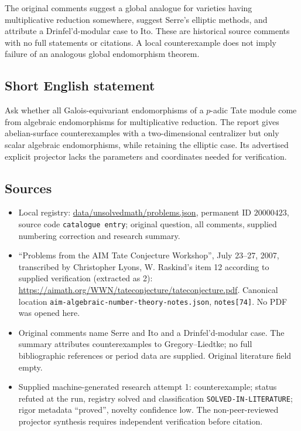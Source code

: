 \documentclass[11pt]{article}
\begin{document}
The original comments suggest a global analogue for varieties having multiplicative reduction somewhere, suggest Serre's elliptic methods, and attribute a Drinfel'd-modular case to Ito. These are historical source comments with no full statements or citations. A local counterexample does not imply failure of an analogous global endomorphism theorem.
\subsection{Short English statement}
Ask whether all Galois-equivariant endomorphisms of a $p$-adic Tate module come from algebraic endomorphisms for multiplicative reduction. The report gives abelian-surface counterexamples with a two-dimensional centralizer but only scalar algebraic endomorphisms, while retaining the elliptic case. Its advertised explicit projector lacks the parameters and coordinates needed for verification.
\subsection{Sources}
\begin{itemize}
\item Local registry: \url{data/unsolvedmath/problems.json}, permanent ID $20000423$, source code \texttt{catalogue entry}; original question, all comments, supplied numbering correction and research summary.
\item ``Problems from the AIM Tate Conjecture Workshop'', July 23--27, 2007, transcribed by Christopher Lyons, W. Raskind's item 12 according to supplied verification (extracted as 2): \url{https://aimath.org/WWN/tateconjecture/tateconjecture.pdf}. Canonical location \texttt{aim-algebraic-number-theory-notes.json}, \texttt{notes[74]}. No PDF was opened here.
\item Original comments name Serre and Ito and a Drinfel'd-modular case. The summary attributes counterexamples to Gregory--Liedtke; no full bibliographic references or period data are supplied. Original literature field empty.
\item Supplied machine-generated research attempt 1: counterexample; status refuted at the run, registry solved and classification \texttt{SOLVED-IN-LITERATURE}; rigor metadata ``proved'', novelty confidence low. The non-peer-reviewed projector synthesis requires independent verification before citation.
\end{itemize}
\end{document}

